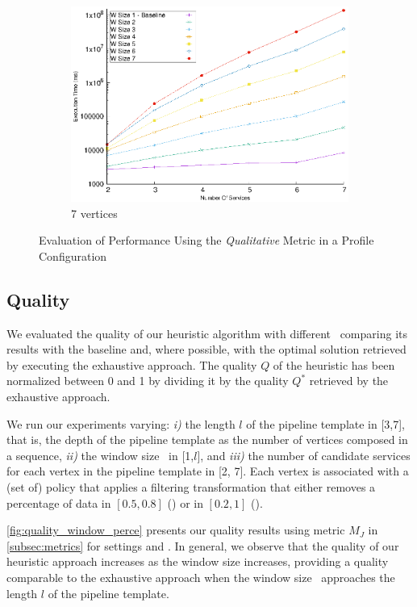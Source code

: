 \begin{figure}[!t]
\begin{subfigure}{0.45\textwidth}
        \includegraphics[width=\textwidth]{Images/graphs/window_time_performance_qualitative_n7_s7_50_80_n7}
        \caption{7 vertices}
        \label{fig:time_window_perce_wide_7n}
      \end{subfigure}
      \caption{{\color{OurColor2}Evaluation of Performance Using the \emph{Qualitative} Metric in a \average Profile Configuration}}
      \label{fig:time_window_perce_average}
    \end{figure}

    \subsection{Quality}\label{subsec:experiments_quality}
    We evaluated the quality of our heuristic algorithm with different \windowsize\ comparing its results with the baseline and, where possible, with the optimal solution retrieved by executing the exhaustive approach.
    The quality $Q$ of the heuristic has been normalized between 0 and 1 by dividing it by the quality $Q^*$ retrieved by the exhaustive approach.

    We run our experiments varying: \emph{i)} the length $l$ of the pipeline template in [3,7], that is, the depth of the pipeline template as the number of vertices composed in a sequence, \emph{ii)} the window size \windowsize\ in [1,$l$], and \emph{iii)} the number of candidate services for each vertex in the pipeline template in [2, 7]. Each vertex is associated with a (set of) policy that applies a filtering transformation that either removes a percentage of data in $[0.5,0.8]$ (\average) or in $[0.2,1]$ (\wide).

      {\color{OurColor2}\cref{fig:quality_window_perce} presents}  our quality results using metric $M_J$ in \cref{subsec:metrics} for settings \wide and \average.
    In general, we observe that the quality of our heuristic approach increases as the window size increases, providing a quality comparable to the exhaustive approach when the window size \windowsize\ approaches the length $l$ of the pipeline template.

